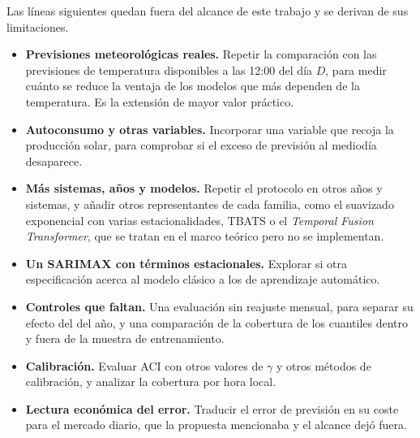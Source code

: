 Las líneas siguientes quedan fuera del alcance de este trabajo y se derivan de
sus limitaciones.
\begin{itemize}
	\item \textbf{Previsiones meteorológicas reales.} Repetir la comparación con
	las previsiones de temperatura disponibles a las 12:00 del día $D$, para medir
	cuánto se reduce la ventaja de los modelos que más dependen de la temperatura.
	Es la extensión de mayor valor práctico.
	\item \textbf{Autoconsumo y otras variables.} Incorporar una variable que
	recoja la producción solar, para comprobar si el exceso de previsión al
	mediodía desaparece.
	\item \textbf{Más sistemas, años y modelos.} Repetir el protocolo en otros años
	y sistemas, y añadir otros representantes de cada familia, como el suavizado
	exponencial con varias estacionalidades, TBATS o el \textit{Temporal Fusion
	Transformer}, que se tratan en el marco teórico pero no se implementan.
	\item \textbf{Un SARIMAX con términos estacionales.} Explorar si otra
	especificación acerca al modelo clásico a los de aprendizaje automático.
	\item \textbf{Controles que faltan.} Una evaluación sin reajuste mensual, para
	separar su efecto del del año, y una comparación de la cobertura de los
	cuantiles dentro y fuera de la muestra de entrenamiento.
	\item \textbf{Calibración.} Evaluar ACI con otros valores de $\gamma$ y otros
	métodos de calibración, y analizar la cobertura por hora local.
	\item \textbf{Lectura económica del error.} Traducir el error de previsión en
	su coste para el mercado diario, que la propuesta mencionaba y el alcance
	dejó fuera.
\end{itemize}
